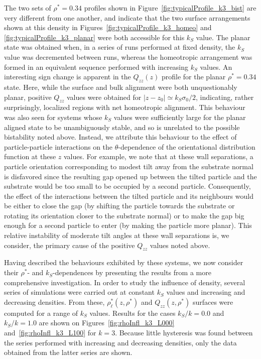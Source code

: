 \documentclass[aps,10pt,twocolumn]{revtex4}
\newcommand{\so}{\sigma_0}
\begin{document}
The two sets of $\rho^*=0.34$ profiles shown in Figure~\ref{fig:typicalProfile_k3_bist} are very different from
one another, and indicate that the two surface arrangements shown at this density in
Figures~\ref{fig:typicalProfile_k3_homeo} and \ref{fig:typicalProfile_k3_planar} were both accessible for this
$k_S$ value. The planar state was obtained when, in a series of runs performed at fixed density, the $k_S$ value
was decremented between runs, whereas the homeotropic arrangement was formed in an equivalent sequence performed
with increasing $k_S$ values. An interesting sign change is apparent in the $Q_{zz}(z)$ profile for the planar
$\rho^*=0.34$ state. Here, while the surface and bulk alignment were both unquestionably planar, positive $Q_{zz}$
values were obtained for $|z-z_0|\simeq k_S \so / 2$, indicating, rather surprisingly, localized regions with net
homeotropic alignment. This behaviour was also seen for systems whose $k_S$ values were sufficiently large for the
planar aligned state to be unambiguously stable, and so is unrelated to the possible bistability noted above.
Instead, we attribute this behaviour to the effect of particle-particle interactions on the $\theta$-dependence of
the orientational distribution function at these $z$ values. For example, we note that at these wall separations,
a particle orientation corresponding to modest tilt away from the substrate normal is disfavored since the
resulting gap opened up between the tilted particle and the substrate would be too small to be occupied by a
second particle. Consequently, the effect of the interactions between the tilted particle and its neighbours would
be either to close the gap (by shifting the particle towards the substrate or rotating its orientation closer to
the substrate normal) or to make the gap big enough for a second particle to enter (by making the particle more
planar). This relative instability of moderate tilt angles at these wall separations is, we consider, the primary
cause of the positive $Q_{zz}$ values noted above.


Having described the behaviours exhibited by these systems, we now consider their $\rho^{*}$- and
$k_S$-dependences by presenting the results from a more comprehensive investigation. In order to study the
influence of density, several series of simulations were carried out at constant $k_S$ values and increasing and
decreasing densities. From these, $\rho^{*}_\ell(z,\rho^{*})$ and $Q_{zz}(z,\rho^{*})$ surfaces were computed for
a range of $k_S$ values. Results for the cases $k_S/k = 0.0$ and $k_S/k = 1.0$ are shown on
Figures~\ref{fig:rhoInfl_k3_L000} and~\ref{fig:rhoInfl_k3_L100} for $k=3$. Because little hysteresis was found
between the series performed with increasing and decreasing densities, only the data obtained
from the latter series are shown.
\end{document}

